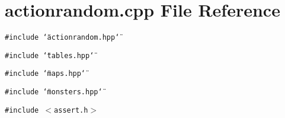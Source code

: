 \section{actionrandom.cpp File Reference}
\label{actionrandom_8cpp}
{\tt \#include \char`\"{}actionrandom.hpp\char`\"{}}\par
{\tt \#include \char`\"{}tables.hpp\char`\"{}}\par
{\tt \#include \char`\"{}maps.hpp\char`\"{}}\par
{\tt \#include \char`\"{}monsters.hpp\char`\"{}}\par
{\tt \#include $<$assert.h$>$}\par
